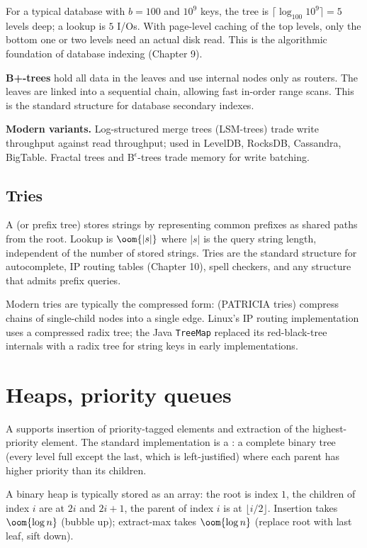 For a typical database with $b = 100$ and $10^9$ keys, the tree is $\lceil \log_{100} 10^9 \rceil = 5$ levels deep; a lookup is $5$ I/Os. With page-level caching of the top levels, only the bottom one or two levels need an actual disk read. This is the algorithmic foundation of database indexing (Chapter 9).

\textbf{B+-trees} hold all data in the leaves and use internal nodes only as routers. The leaves are linked into a sequential chain, allowing fast in-order range scans. This is the standard structure for database secondary indexes.

\textbf{Modern variants.} Log-structured merge trees (LSM-trees) trade write throughput against read throughput; used in LevelDB, RocksDB, Cassandra, BigTable. Fractal trees and B$^\epsilon$-trees trade memory for write batching.

\subsection{Tries}

A  (or prefix tree) stores strings by representing common prefixes as shared paths from the root. Lookup is $\oom{|s|}$ where $|s|$ is the query string length, independent of the number of stored strings. Tries are the standard structure for autocomplete, IP routing tables (Chapter 10), spell checkers, and any structure that admits prefix queries.

Modern tries are typically the compressed form:  (PATRICIA tries) compress chains of single-child nodes into a single edge. Linux's IP routing implementation uses a compressed radix tree; the Java \texttt{TreeMap} replaced its red-black-tree internals with a radix tree for string keys in early implementations.

\section{Heaps, priority queues}

A  supports insertion of priority-tagged elements and extraction of the highest-priority element. The standard implementation is a : a complete binary tree (every level full except the last, which is left-justified) where each parent has higher priority than its children.

A binary heap is typically stored as an array: the root is index $1$, the children of index $i$ are at $2i$ and $2i+1$, the parent of index $i$ is at $\lfloor i/2 \rfloor$. Insertion takes $\oom{\log n}$ (bubble up); extract-max takes $\oom{\log n}$ (replace root with last leaf, sift down).

